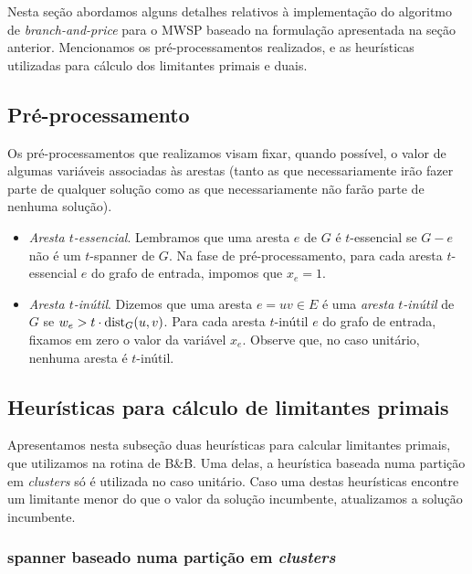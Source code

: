 Nesta seção abordamos alguns detalhes relativos à implementação do
algoritmo de \emph{branch-and-price} para o MWSP baseado na formulação
apresentada na seção anterior. Mencionamos os pré-processamentos
realizados, e as heurísticas utilizadas para cálculo dos limitantes
primais e duais.

\subsection{Pré-processamento}
Os pré-processamentos que realizamos visam fixar, quando possível, o
valor de algumas variáveis associadas às arestas (tanto as que
necessariamente irão fazer parte de qualquer solução como as que
necessariamente não farão parte de nenhuma solução). 

\begin{itemize}
\item \textit{Aresta $t$-essencial}. Lembramos que uma aresta $e$
  de $G$ é $t$-essencial se $G-e$ não é um $t$-spanner de $G$.  Na
  fase de pré-processamento, para cada aresta $t$-essencial $e$ do
  grafo de entrada, impomos que $x_e=1$.

\item \textit{Aresta $t$-inútil}. Dizemos que uma aresta $e=uv \in E$
  é uma \emph{aresta $t$-inútil} de $G$ se \linebreak
  \mbox{$w_e > t \cdot {\mathrm{dist}}_G(u,v)$}. Para cada aresta $t$-inútil $e$ do
  grafo de entrada, fixamos em zero o valor da variável $x_e$. Observe
  que, no caso unitário, nenhuma aresta é $t$-inútil.
  \end{itemize}

\subsection{Heurísticas para cálculo de limitantes primais}
\label{sec:heuristicas}

Apresentamos nesta subseção duas heurísticas para calcular limitantes
primais, que utilizamos na rotina de B\&B.  Uma delas, a heurística
baseada numa partição em \emph{clusters} só é utilizada no caso
unitário.  Caso uma destas heurísticas encontre um limitante menor do
que o valor da solução incumbente, atualizamos a solução incumbente.

\subsubsection{spanner baseado numa partição em \emph{clusters}}

